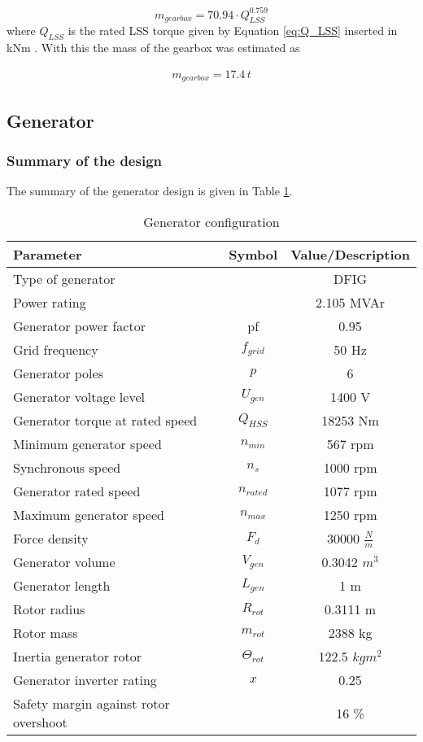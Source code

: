 \begin{equation}
    m_{gearbox} = 70.94 \cdot Q_{LSS}^{0.759}
\end{equation}
where $Q_{LSS}$ is the rated LSS torque given by Equation \ref{eq:Q_LSS} inserted in kNm \cite{Fingersh2006}. With this the mass of the gearbox was estimated as

\begin{align}
m_{gearbox} = 17.4 \, t
\end{align}


\subsection{Generator}

\subsubsection{Summary of the design}

The summary of the generator design is given in Table \ref{tab:generator_config}. 
\begin{table}[h]
\centering
\caption{Generator configuration}
\label{tab:generator_config}
\begin{tabular}{ |l|c|c|} 
\hline
\textbf{Parameter} & Symbol & \textbf{Value/Description}  \\ 
\hline
Type of generator & & DFIG\\
Power rating & & 2.105 MVAr\\
Generator power factor & pf & 0.95\\
Grid frequency & $f_{grid}$ & 50 Hz  \\
Generator poles & $p$ & 6\\
Generator voltage level & $U_{gen}$ & 1400 V\\
Generator torque at rated speed & $Q_{HSS}$ & 18253 Nm \\
Minimum generator speed & $n_{min}$ & 567 rpm\\
Synchronous speed & $n_s$ & 1000 rpm\\
Generator rated speed & $n_{rated}$ & 1077 rpm\\
Maximum generator speed & $n_{max}$ & 1250 rpm \\
Force density & $F_d$ & 30000 $\frac{N}{m}$\\
Generator volume & $V_{gen}$ & 0.3042 $m^3$\\
Generator length & $L_{gen}$ & 1 m\\
Rotor radius & $R_{rot}$ & 0.3111 m\\
Rotor mass & $m_{rot}$ & 2388 kg \\
Inertia generator rotor & $\Theta_{rot}$ & 122.5 $kg m^2$\\
Generator inverter rating & $x$ & 0.25\\
Safety margin against rotor overshoot & & 16 \%\\
\hline
\end{tabular} \\
\end{table}

